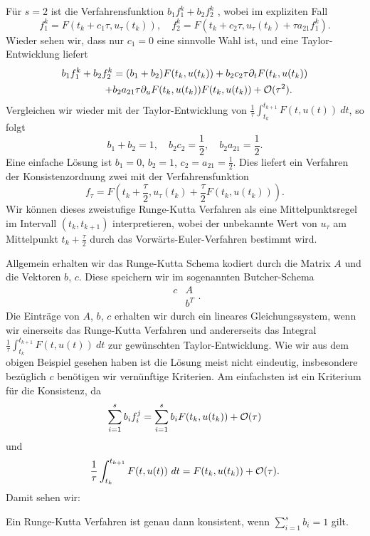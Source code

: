 \begin{example}{}{}
Für $s=2$ ist die Verfahrensfunktion $b_1 f_1^k +b_2 f_2^k$ , wobei im expliziten Fall
$$ f_1^k = F(t_k + c_1 \tau, u_\tau(t_k)), \quad f_2^k = F(t_k + c_2 \tau, u_\tau(t_k) +  \tau a_{21} f_1^k). $$
Wieder sehen wir, dass nur $c_1=0$ eine sinnvolle Wahl ist, und eine Taylor-Entwicklung liefert
%
\begin{align*}
b_1 f_1^k +b_2 f_2^k &= 
(b_1 + b_2) F(t_k , u(t_k)) + b_2 c_2 \tau \partial_t F(t_k , u (t_k))\\ + 
&b_2 a_{21} \tau \partial_u F(t_k , u (t_k)) F(t_k , u (t_k)) + {\cal O}(\tau^2).
\end{align*}
%
Vergleichen wir wieder mit der Taylor-Entwicklung von $\frac{1}\tau \int_{t_k}^{t_{k+1}} F(t,u(t)) ~dt$, so folgt
$$ b_1+b_2 = 1, \quad b_2 c_2 =\frac{1}2, \quad b_2 a_{21} =\frac{1}2. $$
Eine einfache Lösung ist $b_1=0$, $b_2=1$, $c_2=a_{21} = \frac{1}2$. Dies liefert ein Verfahren der Konsistenzordnung zwei mit der Verfahrensfunktion
$$ f_\tau = F(t_k +\frac{\tau}2,u_\tau(t_k) + \frac{\tau}2 F(t_k,u(t_k))). $$ 
Wir können dieses zweistufige Runge-Kutta Verfahren als eine Mittelpunktsregel im Intervall $(t_k,t_{k+1})$ interpretieren, wobei der unbekannte Wert von $u_\tau$ am Mittelpunkt $t_k +\frac{\tau}2$ durch das Vorwärts-Euler-Verfahren bestimmt wird.
\end{example}

Allgemein erhalten wir das Runge-Kutta Schema kodiert durch die Matrix $A$ und die Vektoren $b$, $c$. Diese speichern wir im sogenannten Butcher-Schema
$$ \begin{array}{cc} c & A \\ & b^T \end{array}. $$
Die Einträge von $A$, $b$, $c$ erhalten wir durch ein lineares Gleichungssystem, wenn wir einerseits das Runge-Kutta Verfahren
und andererseits das Integral $\frac{1}\tau \int_{t_k}^{t_{k+1}} F(t,u(t))~dt$ zur gewünschten Taylor-Entwicklung. Wie wir aus dem obigen Beispiel gesehen haben ist die Lösung meist nicht eindeutig, insbesondere bezüglich $c$ benötigen wir vernünftige Kriterien. Am einfachsten ist ein Kriterium für die Konsistenz, da
$$ \sum_{i=1}^s b_i f_i^j =  \sum_{i=1}^s b_i F(t_k,u(t_k)) + {\cal O}(\tau) $$ 
und 
$$ \frac{1}\tau \int_{t_k}^{t_{k+1}} F(t,u(t))~dt = F(t_k,u(t_k)) + {\cal O}(\tau) .$$ 
Damit sehen wir:

\begin{lemma}{}{}
Ein Runge-Kutta Verfahren ist genau dann konsistent, wenn $\sum_{i=1}^s b_i = 1$ gilt. 
\end{lemma} 

